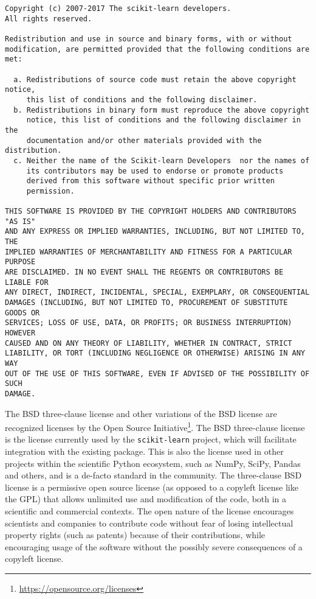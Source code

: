 \documentclass[11pt,letterpaper]{article}
\newcommand{\sklearn}[0]{\texttt{scikit-learn}\xspace}                    %
\begin{document}
\begin{verbatim}
Copyright (c) 2007-2017 The scikit-learn developers.
All rights reserved.

Redistribution and use in source and binary forms, with or without
modification, are permitted provided that the following conditions are met:

  a. Redistributions of source code must retain the above copyright notice,
     this list of conditions and the following disclaimer.
  b. Redistributions in binary form must reproduce the above copyright
     notice, this list of conditions and the following disclaimer in the
     documentation and/or other materials provided with the distribution.
  c. Neither the name of the Scikit-learn Developers  nor the names of
     its contributors may be used to endorse or promote products
     derived from this software without specific prior written
     permission. 

THIS SOFTWARE IS PROVIDED BY THE COPYRIGHT HOLDERS AND CONTRIBUTORS "AS IS"
AND ANY EXPRESS OR IMPLIED WARRANTIES, INCLUDING, BUT NOT LIMITED TO, THE
IMPLIED WARRANTIES OF MERCHANTABILITY AND FITNESS FOR A PARTICULAR PURPOSE
ARE DISCLAIMED. IN NO EVENT SHALL THE REGENTS OR CONTRIBUTORS BE LIABLE FOR
ANY DIRECT, INDIRECT, INCIDENTAL, SPECIAL, EXEMPLARY, OR CONSEQUENTIAL
DAMAGES (INCLUDING, BUT NOT LIMITED TO, PROCUREMENT OF SUBSTITUTE GOODS OR
SERVICES; LOSS OF USE, DATA, OR PROFITS; OR BUSINESS INTERRUPTION) HOWEVER
CAUSED AND ON ANY THEORY OF LIABILITY, WHETHER IN CONTRACT, STRICT
LIABILITY, OR TORT (INCLUDING NEGLIGENCE OR OTHERWISE) ARISING IN ANY WAY
OUT OF THE USE OF THIS SOFTWARE, EVEN IF ADVISED OF THE POSSIBILITY OF SUCH
DAMAGE.
\end{verbatim}


The BSD three-clause license and other variations of the BSD license
are recognized licenses by the Open Source
Initiative\footnote{\url{https://opensource.org/licenses}}.
The BSD three-clause license is the license currently used by the \sklearn
project, which will facilitate integration with the existing package.
This is also the license used in other projects within the scientific Python
ecosystem, such as NumPy, SciPy, Pandas and others, and is a de-facto
standard in the community. The three-clause BSD
license is a permissive open source license (as opposed to a copyleft license
like the GPL) that allows unlimited use and modification of the code, both in a
scientific and commercial contexts. The open nature of the license encourages scientists
and companies to contribute code without fear of losing intellectual property rights
(such as patents) because of their contributions, while encouraging usage of
the software without the possibly severe consequences of a copyleft license.
\end{document}
